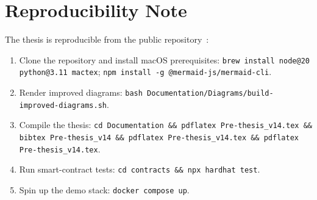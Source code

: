 \documentclass[12pt,a4paper]{report}
\begin{document}
\chapter{Reproducibility Note}
\label{app:repro}

The thesis is reproducible from the public repository~\cite{cwbRepo2026}:

\begin{enumerate}[leftmargin=*,itemsep=2pt]
    \item Clone the repository and install macOS prerequisites: \texttt{brew install node@20 python@3.11 mactex}; \texttt{npm install -g @mermaid-js/mermaid-cli}.
    \item Render improved diagrams: \texttt{bash Documentation/Diagrams/build-improved-diagrams.sh}.
    \item Compile the thesis: \texttt{cd Documentation \&\& pdflatex Pre-thesis\_v14.tex \&\& bibtex Pre-thesis\_v14 \&\& pdflatex Pre-thesis\_v14.tex \&\& pdflatex Pre-thesis\_v14.tex}.
    \item Run smart-contract tests: \texttt{cd contracts \&\& npx hardhat test}.
    \item Spin up the demo stack: \texttt{docker compose up}.
\end{enumerate}



\end{document}
